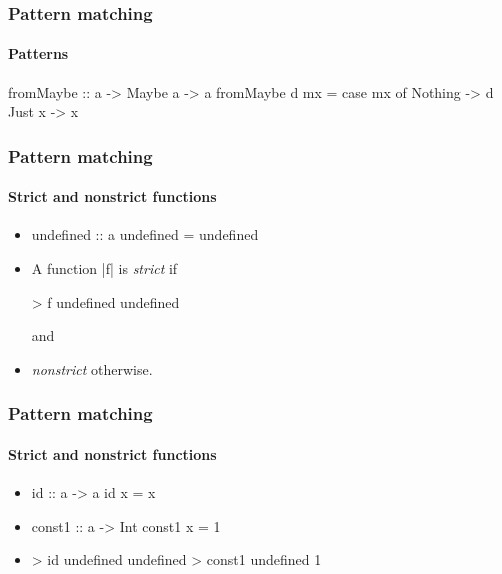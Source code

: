\documentclass{beamer}
\begin{document}
\begin{frame}[fragile]
  \frametitle{Pattern matching}
  \framesubtitle{Patterns}

  \begin{example}
    \begin{code}
fromMaybe :: a -> Maybe a -> a
fromMaybe d mx =
  case mx of
    Nothing -> d
    Just x  -> x
    \end{code}
  \end{example}
\end{frame}


\begin{frame}[fragile]
  \frametitle{Pattern matching}
  \framesubtitle{Strict and nonstrict functions}

  \begin{itemize}
  \item
    \begin{code}
undefined :: a
undefined = undefined
    \end{code}
  \end{itemize}
  \begin{itemize}
  \item
    A function |f| is \emph{strict} if
    \begin{code}
> f undefined
undefined
    \end{code}
    and
  \item
    \emph{nonstrict} otherwise.
  \end{itemize}
\end{frame}

\begin{frame}[fragile]
  \frametitle{Pattern matching}
  \framesubtitle{Strict and nonstrict functions}

  \begin{examples}
  \begin{itemize}
  \item
    \begin{code}
id :: a -> a
id x = x
    \end{code}
  \item
    \begin{code}
const1 :: a -> Int
const1 x = 1
    \end{code}
  \item
    \begin{code}
> id undefined
undefined
> const1 undefined
1
    \end{code}
  \end{itemize}
  \end{examples}
\end{frame}
\end{document}
